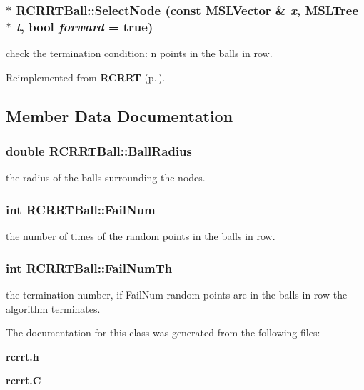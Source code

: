 \subsubsection{ $\ast$ RCRRTBall::Select\-Node (const {\bf MSLVector} \& {\em x}, {\bf MSLTree} $\ast$ {\em t}, bool {\em forward} = true)\hspace{0.3cm}{\tt  [virtual]}}\label{classRCRRTBall_a2}


check the termination condition: n points in the balls in row.



Reimplemented from {\bf RCRRT} {\rm (p.\,\pageref{classRCRRT_a6})}.

\subsection{Member Data Documentation}
\subsubsection{\setlength{\rightskip}{0pt plus 5cm}double RCRRTBall::Ball\-Radius}\label{classRCRRTBall_m0}


the radius of the balls surrounding the nodes.

\subsubsection{\setlength{\rightskip}{0pt plus 5cm}int RCRRTBall::Fail\-Num}\label{classRCRRTBall_m2}


the number of times of the random points in the balls in row.

\subsubsection{\setlength{\rightskip}{0pt plus 5cm}int RCRRTBall::Fail\-Num\-Th}\label{classRCRRTBall_m1}


the termination number, if Fail\-Num random points are in the balls in row the algorithm terminates.



The documentation for this class was generated from the following files:\begin{CompactItemize}
\item 
{\bf rcrrt.h}\item 
{\bf rcrrt.C}\end{CompactItemize}
